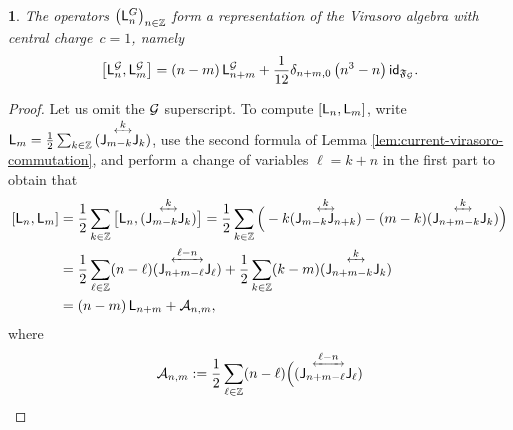 \documentclass[12pt,oneside,english]{amsart}
\numberwithin{equation}{section}
\numberwithin{figure}{section}
\theoremstyle{plain}
\newtheorem{thm}{\protect\theoremname}
\theoremstyle{plain}
\theoremstyle{plain}
\theoremstyle{plain}
\theoremstyle{remark}
\theoremstyle{definition}
\theoremstyle{plain}
\theoremstyle{plain}
\numberwithin{thm}{section}
\providecommand{\theoremname}{Theorem}
\providecommand{\theoremname}{Theorem}
\providecommand{\theoremname}{Theorem}
\providecommand{\theoremname}{Theorem}
\begin{document}
\begin{thm}
\label{thm:gff}The operators $\left(\mathsf{L}_{n}^{G}\right)_{n\in\mathbb{Z} }$
form a representation of the Virasoro algebra with central
charge~${c=1}$, namely 
\[
\left[\mathsf{L}_{n}^{\mathcal{G}},\mathsf{L}_{m}^{\mathcal{G}}\right]
= 
\left(n-m\right) \mathsf{L}_{n+m}^{\mathcal{G}}
+ \frac{1}{12} \delta_{n+m,0} \left(n^{3}-n\right) \mathsf{id}_{\mathfrak{F}_{\mathcal{G}}} .
\]
\end{thm}
\begin{proof}
Let us omit the $\mathcal{G}$ superscript. To compute 
$\left[\mathsf{L}_{n},\mathsf{L}_{m}\right]$,
write 
$\virL{m} 
= \frac{1}{2}\sum_{k\in\Z } \ourorder{\currmode{m-k}}{\currmode{k}}{k}$,
use the second formula of Lemma \ref{lem:current-virasoro-commutation},
and perform a change of variables $\ell = k+n$ in the first part to
obtain that %
\begin{align*}
\left[\virL{n},\virL{m}\right]
= \; & \frac{1}{2} \sum_{k\in\Z} \big[ \virL{n}, 
		\ourorder{\currmode{m-k}}{\currmode{k}}{k} \big]
	= \frac{1}{2} \sum_{k\in\Z} \Big(
		- k \ourorder{\currmode{m-k}}{\currmode{n+k}}{k}
		- (m-k) \ourorder{\currmode{n+m-k}}{\currmode{k}}{k} \Big) \\
= \; & \frac{1}{2} \sum_{\ell\in\Z} 
		(n-\ell) \ourorder{\currmode{n+m-\ell}}{\currmode{\ell}}{\ell-n} 
	+ \frac{1}{2} \sum_{k\in\Z} (k-m) 
		  \ourorder{\currmode{n+m-k}}{\currmode{k}}{k} \\
= \; & (n-m) \, \virL{n+m} + \mathcal{A}_{n,m} ,
\end{align*}
where 
\[
\mathcal{A}_{n,m} 
:= \frac{1}{2}\sum_{\ell\in\Z } (n-\ell) \Big(
	\ourorder{\currmode{n+m-\ell}}{\currmode{\ell}}{\ell-n}
\]
\end{proof}
\end{document}
